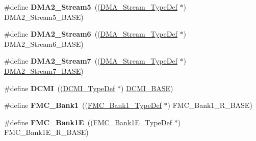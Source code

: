 \begin{DoxyCompactItemize}
\item 
\#define {\bfseries D\+M\+A2\+\_\+\+Stream5}~((\hyperlink{struct_d_m_a___stream___type_def}{D\+M\+A\+\_\+\+Stream\+\_\+\+Type\+Def} $\ast$) D\+M\+A2\+\_\+\+Stream5\+\_\+\+B\+A\+SE)\hypertarget{group___peripheral__declaration_gac40f58718761251875b5a897287efd83}{}\label{group___peripheral__declaration_gac40f58718761251875b5a897287efd83}

\item 
\#define {\bfseries D\+M\+A2\+\_\+\+Stream6}~((\hyperlink{struct_d_m_a___stream___type_def}{D\+M\+A\+\_\+\+Stream\+\_\+\+Type\+Def} $\ast$) D\+M\+A2\+\_\+\+Stream6\+\_\+\+B\+A\+SE)\hypertarget{group___peripheral__declaration_ga11a00b283e0911cd427e277e5a314ccc}{}\label{group___peripheral__declaration_ga11a00b283e0911cd427e277e5a314ccc}

\item 
\#define {\bfseries D\+M\+A2\+\_\+\+Stream7}~((\hyperlink{struct_d_m_a___stream___type_def}{D\+M\+A\+\_\+\+Stream\+\_\+\+Type\+Def} $\ast$) \hyperlink{group___peripheral__memory__map_gaa9faa708ad2440d24eb1064cba9bb06d}{D\+M\+A2\+\_\+\+Stream7\+\_\+\+B\+A\+SE})\hypertarget{group___peripheral__declaration_gacc135dbca0eca67d5aa0abc555f053ce}{}\label{group___peripheral__declaration_gacc135dbca0eca67d5aa0abc555f053ce}

\item 
\#define {\bfseries D\+C\+MI}~((\hyperlink{struct_d_c_m_i___type_def}{D\+C\+M\+I\+\_\+\+Type\+Def} $\ast$) \hyperlink{group___peripheral__memory__map_ga55b794507e021135486de57129a2505c}{D\+C\+M\+I\+\_\+\+B\+A\+SE})\hypertarget{group___peripheral__declaration_ga049d9f61cb078d642e68f3c22bb6d90c}{}\label{group___peripheral__declaration_ga049d9f61cb078d642e68f3c22bb6d90c}

\item 
\#define {\bfseries F\+M\+C\+\_\+\+Bank1}~((\hyperlink{struct_f_m_c___bank1___type_def}{F\+M\+C\+\_\+\+Bank1\+\_\+\+Type\+Def} $\ast$) F\+M\+C\+\_\+\+Bank1\+\_\+\+R\+\_\+\+B\+A\+SE)\hypertarget{group___peripheral__declaration_gadbd2f968da05cf7bb497d2ce38ae88b6}{}\label{group___peripheral__declaration_gadbd2f968da05cf7bb497d2ce38ae88b6}

\item 
\#define {\bfseries F\+M\+C\+\_\+\+Bank1E}~((\hyperlink{struct_f_m_c___bank1_e___type_def}{F\+M\+C\+\_\+\+Bank1\+E\+\_\+\+Type\+Def} $\ast$) F\+M\+C\+\_\+\+Bank1\+E\+\_\+\+R\+\_\+\+B\+A\+SE)\hypertarget{group___peripheral__declaration_ga91eebdd476549799293eaa7a166a3cb3}{}\label{group___peripheral__declaration_ga91eebdd476549799293eaa7a166a3cb3}


\end{DoxyCompactItemize}
